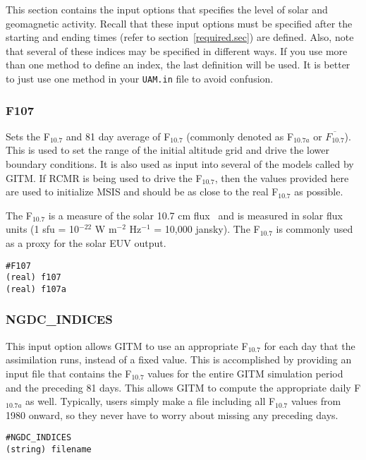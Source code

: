 This section contains the input options that specifies the level of solar and geomagnetic activity.  Recall that these input options must be specified after the starting and ending times (refer to section~\ref{required.sec}) are defined.  Also, note that several of these indices may be specified in different ways.  If you use more than one method to define an index, the last definition will be used.  It is better to just use one method in your {\tt UAM.in} file to avoid confusion.

\subsubsection{F107}
\label{f107.sec}

Sets the F$_{10.7}$ and 81 day average of F$_{10.7}$ (commonly denoted as F$_{10.7a}$ or $\overline{F_{10.7}}$).  This is used to set the range of the initial altitude grid and drive the lower boundary conditions.  It is also used as input into several of the models called by GITM.  If RCMR is being used to drive the F$_{10.7}$, then the values provided here are used to initialize MSIS and should be as close to the real F$_{10.7}$ as possible.

The F$_{10.7}$ is a measure of the solar 10.7 cm flux~\citep{Covington:1948aa} and is measured in solar flux units (1 sfu = 10$^{-22}$ W m$^{-2}$ Hz$^{-1}$ = 10,000 jansky).  The F$_{10.7}$ is commonly used as a proxy for the solar EUV output.  

\begin{verbatim}
#F107
(real) f107
(real) f107a
\end{verbatim}

\subsubsection{NGDC\_INDICES}
\label{ngdc_indices.sec}

This input option allows GITM to use an appropriate F$_{10.7}$ for each day that the assimilation runs, instead of a fixed value.  This is accomplished by providing an input file that contains the F$_{10.7}$ values for the entire GITM simulation period and the preceding 81 days.  This allows GITM to compute the appropriate daily F$_{10.7a}$ as well.  Typically, users simply make a file including all F$_{10.7}$ values from 1980 onward, so they never have to worry about missing any preceding days.

\begin{verbatim}
#NGDC_INDICES
(string) filename
\end{verbatim}

